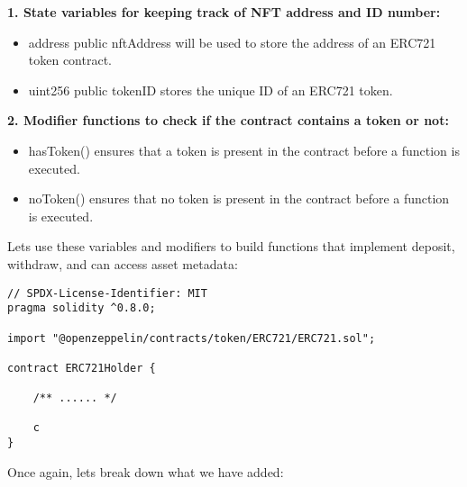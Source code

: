 \documentclass{article}
\theoremstyle{theorem}
\theoremstyle{definition}
\theoremstyle{remark}
\begin{document}
\medskip\noindent
\textbf{1. State variables for keeping track of NFT address and ID number:}
\begin{itemize}
    \item \colorbox{Gainsboro!60!Lavender}{address public nftAddress} will be used to store the address of an ERC721 token contract.
    \item  \colorbox{Gainsboro!60!Lavender}{uint256 public tokenID} stores the unique ID of an ERC721 token.
\end{itemize}
\textbf{2. Modifier functions to check if the contract contains a token or not:}
\begin{itemize}
    \item \colorbox{Gainsboro!60!Lavender}{hasToken()} ensures that a token is present in the contract before a function is executed.
    \item \colorbox{Gainsboro!60!Lavender}{noToken()} ensures that no token is present in the contract before a function is executed.
\end{itemize} 

\medskip\noindent
Lets use these variables and modifiers to build functions that implement deposit, withdraw, and can access asset metadata:

\begin{itemize}
\begin{lstlisting}
// SPDX-License-Identifier: MIT
pragma solidity ^0.8.0;

import "@openzeppelin/contracts/token/ERC721/ERC721.sol";

contract ERC721Holder {

    /** ...... */
    
    c
}
\end{lstlisting}
\end{itemize}

\medskip\noindent
Once again, lets break down what we have added:
\end{document}
